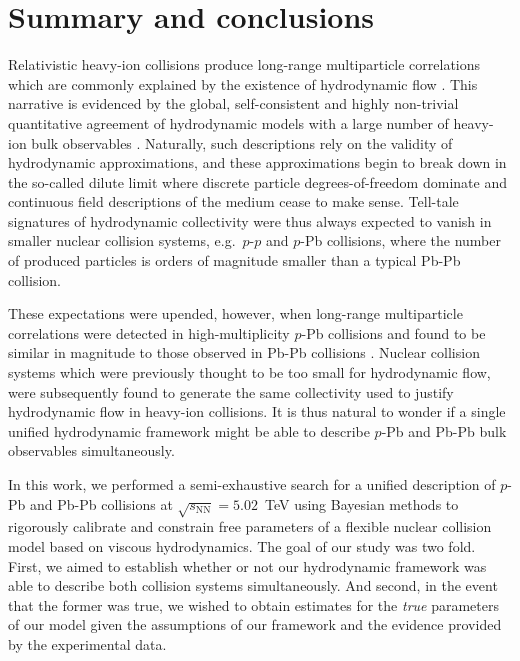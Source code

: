 \documentclass[aps,prc,reprint,amsmath,nofootinbib]{revtex4-1}
\newcommand{\sqrts}{\sqrt{s_\mathrm{NN}}}
\begin{document}
\section{Summary and conclusions}
\label{sec:summary}

Relativistic heavy-ion collisions produce long-range multiparticle correlations which are commonly explained by the existence of hydrodynamic flow \cite{deSouza:2015ena}.
This narrative is evidenced by the global, self-consistent and highly non-trivial quantitative agreement of hydrodynamic models with a large number of heavy-ion bulk observables \cite{Niemi:2015qia, Bernhard:2016tnd, Gale:2012rq}.
Naturally, such descriptions rely on the validity of hydrodynamic approximations, and these approximations begin to break down in the so-called dilute limit where discrete particle degrees-of-freedom dominate and continuous field descriptions of the medium cease to make sense.
Tell-tale signatures of hydrodynamic collectivity were thus always expected to vanish in smaller nuclear collision systems, e.g.\ $p$-$p$ and $p$-Pb collisions, where the number of produced particles is orders of magnitude smaller than a typical Pb-Pb collision.

These expectations were upended, however, when long-range multiparticle correlations were detected in high-multiplicity $p$-Pb collisions and found to be similar in magnitude to those observed in Pb-Pb collisions \cite{CMS:2012qk, Abelev:2012ola, Aad:2012gla}.
Nuclear collision systems which were previously thought to be too small for hydrodynamic flow, were subsequently found to generate the same collectivity used to justify hydrodynamic flow in heavy-ion collisions.
It is thus natural to wonder if a single unified hydrodynamic framework might be able to describe $p$-Pb and Pb-Pb bulk observables simultaneously.

In this work, we performed a semi-exhaustive search for a unified description of $p$-Pb and Pb-Pb collisions at $\sqrts=5.02$~TeV using Bayesian methods to rigorously calibrate and constrain free parameters of a flexible nuclear collision model based on viscous hydrodynamics.
The goal of our study was two fold.
First, we aimed to establish whether or not our hydrodynamic framework was able to describe both collision systems simultaneously.
And second, in the event that the former was true, we wished to obtain estimates for the \emph{true} parameters of our model given the assumptions of our framework and the evidence provided by the experimental data.
\end{document}
